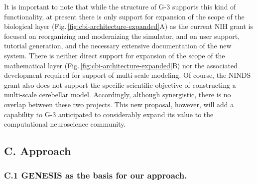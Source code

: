 \documentclass[12pt]{article}
\begin{document}
It is important to note that while the structure
of G-3 supports this kind of functionality, at present there is only support for expansion
  of the scope of the biological layer (Fig.\,\ref{fig:cbi-architecture-expanded}A) as the current NIH grant is
focused on reorganizing and modernizing the simulator, and on
user support, tutorial generation, and the necessary extensive
documentation of the new system. There is neither direct
support for expansion of the scope
  of the mathematical layer (Fig.\,\ref{fig:cbi-architecture-expanded}B) nor the associated development required for support of
multi-scale modeling. Of course, the NINDS grant also does
not support the specific scientific objective of constructing a
multi-scale cerebellar model.  Accordingly, although synergistic,
there is no overlap between these two projects. This new proposal,
however, will add a capability to G-3 anticipated to considerably expand
its value to the computational neuroscience community.\\

\subsection*{C. Approach}

\subsubsection*{C.1 GENESIS as the basis for our approach.}
\end{document}
